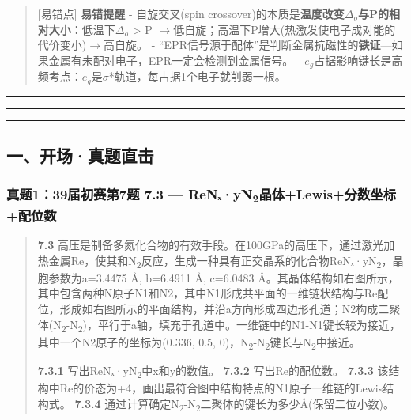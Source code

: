 \documentclass[a4paper,11pt]{ctexart}
\newcommand{\箭}{\ensuremath{\rightarrow}}
\newcommand{\左箭}{\ensuremath{\leftarrow}}
\newcommand{\上箭}{\ensuremath{\uparrow}}
\newcommand{\下箭}{\ensuremath{\downarrow}}
\newcommand{\衡}{\ensuremath{\rightleftharpoons}}
\newcommand{\双箭}{\ensuremath{\leftrightarrow}}
\newcommand{\约等于}{\ensuremath{\approx}}
\newcommand{\小于等于}{\ensuremath{\leq}}
\newcommand{\大于等于}{\ensuremath{\geq}}
\newcommand{\不等于}{\ensuremath{\neq}}
\newcommand{\西格马}{\ensuremath{\sigma}}
\newcommand{\派}{\ensuremath{\pi}}
\begin{document}
\begin{quote}
{[}易错点{]} \textbf{易错提醒}
- 自旋交叉(spin crossover)的本质是\textbf{温度改变\(\Delta_o\)与P的相对大小}：低温下\(\Delta_o\) \textgreater{} P \箭 低自旋；高温下P增大(热激发使电子成对能的代价变小)\箭 高自旋。
- ``EPR信号源于配体''是判断金属抗磁性的\textbf{铁证}---如果金属有未配对电子，EPR一定会检测到金属信号。
- \(e_g\)占据影响键长是高频考点：\(e_g\)是\西格马*轨道，每占据1个电子就削弱一根。
\end{quote}

\begin{center}\rule{0.5\linewidth}{0.5pt}\end{center}

\begin{center}\rule{0.5\linewidth}{0.5pt}\end{center}

\begin{center}\rule{0.5\linewidth}{0.5pt}\end{center}

\subsection{一、开场·真题直击}\label{ux4e00ux5f00ux573aux771fux9898ux76f4ux51fb-5}

\subsubsection{\texorpdfstring{真题1：39届初赛第7题 7.3 --- ReNₓ·yN\textsubscript{2}晶体+Lewis+分数坐标+配位数}{真题1：39届初赛第7题 7.3 --- ReNₓ·yN2晶体+Lewis+分数坐标+配位数}}\label{ux771fux9898139ux5c4aux521dux8d5bux7b2c7ux9898-7.3-renux2093yn2ux6676ux4f53lewisux5206ux6570ux5750ux6807ux914dux4f4dux6570}

\begin{quote}
\textbf{7.3} 高压是制备多氮化合物的有效手段。在100GPa的高压下，通过激光加热金属Re，使其和N\textsubscript{2}反应，生成一种具有正交晶系的化合物ReNₓ·yN\textsubscript{2}，晶胞参数为a=3.4475 Å, b=6.4911 Å, c=6.0483 Å。其晶体结构如右图所示，其中包含两种N原子N1和N2，其中N1形成共平面的一维链状结构与Re配位，形成如右图所示的平面结构，并沿a方向形成四边形孔道；N2构成二聚体(N\textsubscript{2}-N\textsubscript{2})，平行于a轴，填充于孔道中。一维链中的N1-N1键长较为接近，其中一个N2原子的坐标为(0.336, 0.5, 0)，N\textsubscript{2}-N\textsubscript{2}键长与N\textsubscript{2}中接近。

\textbf{7.3.1} 写出ReNₓ·yN\textsubscript{2}中x和y的数值。
\textbf{7.3.2} 写出Re的配位数。
\textbf{7.3.3} 该结构中Re的价态为+4，画出最符合图中结构特点的N1原子一维链的Lewis结构式。
\textbf{7.3.4} 通过计算确定N\textsubscript{2}-N\textsubscript{2}二聚体的键长为多少Å(保留二位小数)。
\end{quote}
\end{document}
